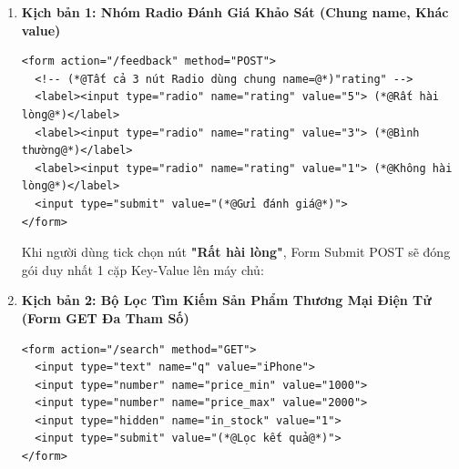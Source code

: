 \documentclass[11pt,oneside]{book}
\begin{document}
\begin{enumerate}[leftmargin=1.5em, itemsep=8pt, parsep=0pt]
\item \textbf{Kịch bản 1: Nhóm Radio Đánh Giá Khảo Sát (Chung name, Khác value)}
\begin{codeWindow}
\begin{lstlisting}[language=HTML5]
<form action="/feedback" method="POST">
  <!-- (*@Tất cả 3 nút Radio dùng chung name=@*)"rating" -->
  <label><input type="radio" name="rating" value="5"> (*@Rất hài lòng@*)</label>
  <label><input type="radio" name="rating" value="3"> (*@Bình thường@*)</label>
  <label><input type="radio" name="rating" value="1"> (*@Không hài lòng@*)</label>
  <input type="submit" value="(*@Gửi đánh giá@*)">
</form>
\end{lstlisting}
\end{codeWindow}

\begin{browserWindow}
\sffamily\small
Khi người dùng tick chọn nút \textbf{"Rất hài lòng"}, Form Submit POST sẽ đóng gói duy nhất 1 cặp Key-Value lên máy chủ:
\begin{center}
\end{center}
\end{browserWindow}

\item \textbf{Kịch bản 2: Bộ Lọc Tìm Kiếm Sản Phẩm Thương Mại Điện Tử (Form GET Đa Tham Số)}
\begin{codeWindow}
\begin{lstlisting}[language=HTML5]
<form action="/search" method="GET">
  <input type="text" name="q" value="iPhone">
  <input type="number" name="price_min" value="1000">
  <input type="number" name="price_max" value="2000">
  <input type="hidden" name="in_stock" value="1">
  <input type="submit" value="(*@Lọc kết quả@*)">
</form>
\end{lstlisting}
\end{codeWindow}


\end{enumerate}
\end{document}
